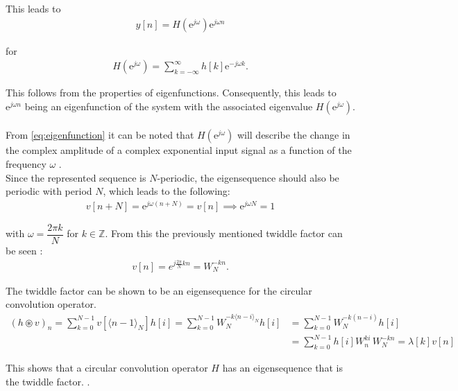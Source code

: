 This leads to
\begin{align}\label{eq:eigenfunction}
y[n] = H(\text{e}^{j \omega}) \text{e}^{j\omega n}
\end{align}

for
\begin{align*}
H(\text{e}^{j\omega}) = \sum_{k=-\infty}^{\infty} h[k]\text{e}^{-j\omega k}.
\end{align*}

This follows from the properties of eigenfunctions. Consequently, this leads to $\text{e}^{j\omega n}$ being an eigenfunction of the system with the associated eigenvalue $H(\text{e}^{j\omega})$.
\\\\
From \eqref{eq:eigenfunction} it can be noted that $H(\text{e}^{j\omega})$ will describe the change in the complex amplitude of a complex exponential input signal as a function of the frequency $\omega$ \cite{DTSP}. 
\\
Since the represented sequence is $N$-periodic, the eigensequence should also be periodic with period $N$, which leads to the following:
\begin{align*}
v[n+N] = \text{e}^{j\omega (n+N)} = v[n] \implies \text{e}^{j\omega N} = 1
\end{align*}

with $\omega = \dfrac{2 \pi k}{N}$ for $k \in \mathbb{Z}$. From this the previously mentioned twiddle factor can be seen \cite{FSP}:
\begin{align*}
v[n] = e^{j\frac{2\pi}{N} kn} = W_N^{-kn}.
\end{align*}

The twiddle factor can be shown to be an eigensequence for the circular convolution operator.
\begin{align*}
	(h\circledast v)_n 
	= \sum_{k=0}^{N-1} v[\langle n-1\rangle_N	]h[i] 
	= \sum_{k=0}^{N-1} W_N^{-k\langle n-i\rangle_N}h[i]
	&= \sum_{k=0}^{N-1} W_N^{-k(n-i)}h[i]\\
	&= \sum_{k=0}^{N-1} h[i] W_n^{ki} \, W_N^{-kn}
	= \lambda[k] v[n]
\end{align*}

This shows that a circular convolution operator $H$ has an eigensequence that is the twiddle factor. .